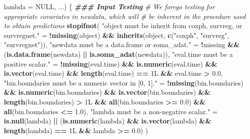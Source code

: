 \documentclass[
]{book}
\newenvironment{Shaded}{\begin{snugshade}}{\end{snugshade}}
\newcommand{\AttributeTok}[1]{\textcolor[rgb]{0.13,0.29,0.53}{#1}}
\newcommand{\CommentTok}[1]{\textcolor[rgb]{0.56,0.35,0.01}{\textit{#1}}}
\newcommand{\ConstantTok}[1]{\textcolor[rgb]{0.56,0.35,0.01}{#1}}
\newcommand{\DocumentationTok}[1]{\textcolor[rgb]{0.56,0.35,0.01}{\textbf{\textit{#1}}}}
\newcommand{\FloatTok}[1]{\textcolor[rgb]{0.00,0.00,0.81}{#1}}
\newcommand{\FunctionTok}[1]{\textcolor[rgb]{0.13,0.29,0.53}{\textbf{#1}}}
\newcommand{\NormalTok}[1]{#1}
\newcommand{\OtherTok}[1]{\textcolor[rgb]{0.56,0.35,0.01}{#1}}
\newcommand{\SpecialCharTok}[1]{\textcolor[rgb]{0.81,0.36,0.00}{\textbf{#1}}}
\newcommand{\StringTok}[1]{\textcolor[rgb]{0.31,0.60,0.02}{#1}}
\begin{document}
\begin{Shaded}
\begin{Highlighting}[]
                         \AttributeTok{lambda =} \ConstantTok{NULL}\NormalTok{, ...) \{ }
  \DocumentationTok{\#\#\# Input Testing}
  \CommentTok{\# We forego testing for appropriate covariates in \textasciigrave{}newdata\textasciigrave{}, which will}
  \CommentTok{\#   be inherent in the procedure used to obtain predictions}
  \FunctionTok{stopifnot}\NormalTok{(}
    \StringTok{"\textasciigrave{}object\textasciigrave{} must be inherit from \textasciigrave{}coxph\textasciigrave{}, \textasciigrave{}survreg\textasciigrave{}, or \textasciigrave{}survregnet\textasciigrave{}."} \OtherTok{=}
      \SpecialCharTok{!}\FunctionTok{missing}\NormalTok{(object) }\SpecialCharTok{\&\&} \FunctionTok{inherits}\NormalTok{(object, }\FunctionTok{c}\NormalTok{(}\StringTok{"coxph"}\NormalTok{, }\StringTok{"survreg"}\NormalTok{, }\StringTok{"survregnet"}\NormalTok{)),}
    \StringTok{"\textasciigrave{}newdata\textasciigrave{} must be a data.frame or soma\_adat."} \OtherTok{=} 
      \SpecialCharTok{!}\NormalTok{missing }\SpecialCharTok{\&\&}\NormalTok{ (}\FunctionTok{is.data.frame}\NormalTok{(newdata) }\SpecialCharTok{||} \FunctionTok{is.soma\_adat}\NormalTok{(newdata)),}
    \StringTok{"\textasciigrave{}eval.time\textasciigrave{} must be a positive scalar."} \OtherTok{=} 
      \SpecialCharTok{!}\FunctionTok{missing}\NormalTok{(eval.time) }\SpecialCharTok{\&\&} \FunctionTok{is.numeric}\NormalTok{(eval.time) }\SpecialCharTok{\&\&} 
        \FunctionTok{is.vector}\NormalTok{(eval.time) }\SpecialCharTok{\&\&} \FunctionTok{length}\NormalTok{(eval.time) }\SpecialCharTok{==}\NormalTok{ 1L }\SpecialCharTok{\&\&}\NormalTok{ eval.time }\SpecialCharTok{\textgreater{}} \FloatTok{0.0}\NormalTok{,}
    \StringTok{"\textasciigrave{}bin.boundaries\textasciigrave{} must be a numeric vector in [0, 1]."} \OtherTok{=} 
      \SpecialCharTok{!}\FunctionTok{missing}\NormalTok{(bin.boundaries) }\SpecialCharTok{\&\&} \FunctionTok{is.numeric}\NormalTok{(bin.boundaries) }\SpecialCharTok{\&\&} 
        \FunctionTok{is.vector}\NormalTok{(bin.boundaries) }\SpecialCharTok{\&\&} \FunctionTok{length}\NormalTok{(bin.boundaries) }\SpecialCharTok{\textgreater{}}\NormalTok{ 1L }\SpecialCharTok{\&\&} 
        \FunctionTok{all}\NormalTok{(bin.boundaries }\SpecialCharTok{\textgreater{}=} \FloatTok{0.0}\NormalTok{) }\SpecialCharTok{\&\&} \FunctionTok{all}\NormalTok{(bin.boundaries }\SpecialCharTok{\textless{}=} \FloatTok{1.0}\NormalTok{),}
    \StringTok{"\textasciigrave{}lambda\textasciigrave{} must be a non{-}negative scalar."} \OtherTok{=} 
      \FunctionTok{is.null}\NormalTok{(lambda) }\SpecialCharTok{||}\NormalTok{ (}\FunctionTok{is.numeric}\NormalTok{(lambda) }\SpecialCharTok{\&\&} \FunctionTok{is.vector}\NormalTok{(lambda) }\SpecialCharTok{\&\&}
                            \FunctionTok{length}\NormalTok{(lambda) }\SpecialCharTok{==}\NormalTok{ 1L }\SpecialCharTok{\&\&}\NormalTok{ lambda }\SpecialCharTok{\textgreater{}=} \FloatTok{0.0}\NormalTok{)}
\NormalTok{  )}
  

\end{Highlighting}
\end{Shaded}
\end{document}

